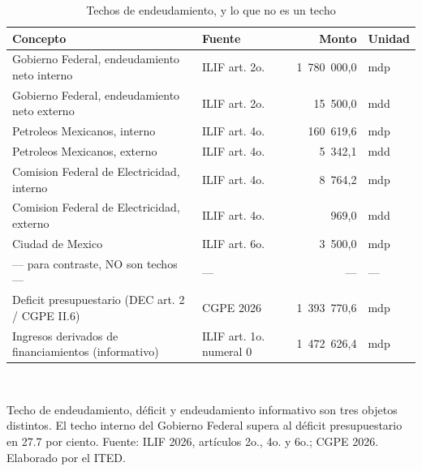\begin{table}[htbp]
\centering
\scriptsize
\caption{Techos de endeudamiento, y lo que no es un techo}
\label{cua:C13_3}
\begin{tabular}{p{7.0cm}p{2.6cm}rl}
\toprule
\textbf{Concepto} & \textbf{Fuente} & \textbf{Monto} & \textbf{Unidad} \\
\midrule
Gobierno Federal, endeudamiento neto interno & ILIF art. 2o. & 1 780 000,0 & mdp \\
Gobierno Federal, endeudamiento neto externo & ILIF art. 2o. & 15 500,0 & mdd \\
Petroleos Mexicanos, interno & ILIF art. 4o. & 160 619,6 & mdp \\
Petroleos Mexicanos, externo & ILIF art. 4o. & 5 342,1 & mdd \\
Comision Federal de Electricidad, interno & ILIF art. 4o. & 8 764,2 & mdp \\
Comision Federal de Electricidad, externo & ILIF art. 4o. & 969,0 & mdd \\
Ciudad de Mexico & ILIF art. 6o. & 3 500,0 & mdp \\
--- para contraste, NO son techos --- & --- & --- & --- \\
Deficit presupuestario (DEC art. 2 / CGPE II.6) & CGPE 2026 & 1 393 770,6 & mdp \\
Ingresos derivados de financiamientos (informativo) & ILIF art. 1o. numeral 0 & 1 472 626,4 & mdp \\
\bottomrule
\end{tabular}
\\[2pt]\begin{minipage}{0.92\textwidth}\scriptsize Techo de endeudamiento, déficit y endeudamiento informativo son tres objetos distintos. El techo interno del Gobierno Federal supera al déficit presupuestario en 27.7 por ciento. Fuente: ILIF 2026, artículos 2o., 4o. y 6o.; CGPE 2026. Elaborado por el ITED.\end{minipage}
\end{table}
